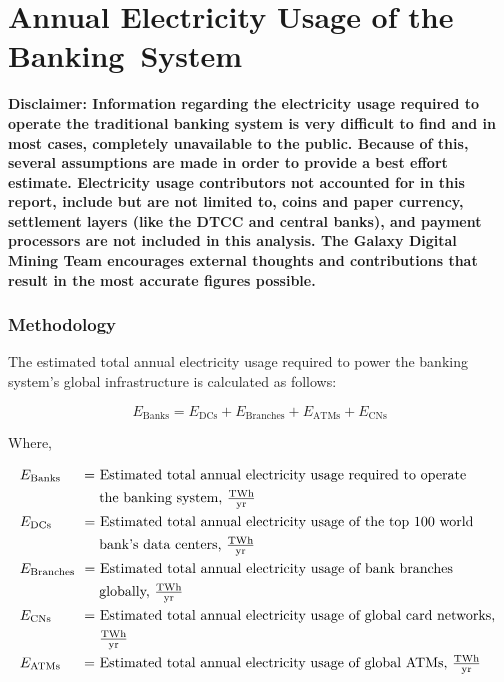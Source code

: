 \section{Annual Electricity Usage of the Banking System}\label{section:banks}
\textbf{Disclaimer: Information regarding the electricity usage required to operate the traditional banking system is very difficult to find and in most cases, completely unavailable to the public.
Because of this, several assumptions are made in order to provide a best effort estimate.
Electricity usage contributors not accounted for in this report, include but are not limited to, coins and paper currency, settlement layers (like the DTCC and central banks), and payment processors are not included in this analysis.
The Galaxy Digital Mining Team encourages external thoughts and contributions that result in the most accurate figures possible.} \\

\subsubsection{Methodology}
The estimated total annual electricity usage required to power the banking system's global infrastructure is calculated as follows:

\begin{equation}
\label{eqn:banks-total}
E_\textrm{Banks} = E_\textrm{DCs} + E_\textrm{Branches} + E_\textrm{ATMs} + E_\textrm{CNs} 
\end{equation}

Where,

\begin{align*}
  &E_\textrm{Banks} \ \textrm{ \quad    = Estimated total annual electricity usage required to operate } \\
  &\textrm{ \qquad \qquad \quad \ the banking system, } \tfrac{ \textrm{{T}Wh} } { \textrm{yr} } \\
  &E_\textrm{DCs} \textrm{ \qquad       = Estimated total annual electricity usage of the top 100 world} \\
  &\textrm{ \qquad  \qquad \quad \ bank's data centers, } \tfrac{ \textrm{{T}Wh} } { \textrm{yr} } \\
  &E_\textrm{Branches} \textrm{ \       = Estimated total annual electricity usage of bank branches} \\
  &\textrm{ \qquad \qquad \quad \ globally, } \tfrac{ \textrm{{T}Wh} } { \textrm{yr} } \\
  &E_\textrm{CNs} \textrm{  \quad \quad = Estimated total annual electricity usage of global card networks, } \\
  &\textrm{  \qquad \qquad \quad \ } \tfrac{ \textrm{{T}Wh} } { \textrm{yr} } \\
  &E_\textrm{ATMs} \textrm{\ \ \quad    = Estimated total annual electricity usage of global ATMs, } \tfrac{ \textrm{{T}Wh} } { \textrm{yr} } \\
\end{align*}


